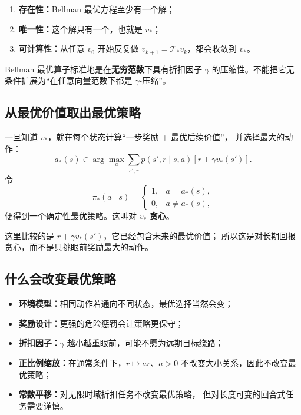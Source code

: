 \documentclass[11pt,a4paper,fontset=fandol]{ctexart}
\newcommand{\vstar}{v_*}
\newcommand{\Tstar}{\mathcal{T}_*}
\begin{document}
\begin{enumerate}
  \item \textbf{存在性：}Bellman 最优方程至少有一个解；
  \item \textbf{唯一性：}这个解只有一个，也就是 \(\vstar\)；
  \item \textbf{可计算性：}从任意 \(v_0\) 开始反复做
  \(v_{k+1}=\Tstar v_k\)，都会收敛到 \(\vstar\)。
\end{enumerate}

\begin{warningbox}[范数条件]
Bellman 最优算子标准地是在\textbf{无穷范数}下具有折扣因子
\(\gamma\) 的压缩性。不能把它无条件扩展为“在任意向量范数下都是
\(\gamma\)-压缩”。
\end{warningbox}

\subsection{从最优价值取出最优策略}

一旦知道 \(\vstar\)，就在每个状态计算“一步奖励 + 最优后续价值”，
并选择最大的动作：
\[
a_*(s)\in\arg\max_a
\sum_{s',r}p(s',r\mid s,a)
\left[r+\gamma\vstar(s')\right].
\]
令
\[
\pi_*(a\mid s)=
\begin{cases}
1,&a=a_*(s),\\
0,&a\neq a_*(s),
\end{cases}
\]
便得到一个确定性最优策略。这叫对 \(\vstar\) \textbf{贪心}。

\begin{warningbox}[“贪心”并不等于只看即时奖励]
这里比较的是 \(r+\gamma\vstar(s')\)，它已经包含未来的最优价值；
所以这是对长期回报贪心，而不是只挑眼前奖励最大的动作。
\end{warningbox}

\subsection{什么会改变最优策略}

\begin{itemize}
  \item \textbf{环境模型：}相同动作若通向不同状态，最优选择当然会变；
  \item \textbf{奖励设计：}更强的危险惩罚会让策略更保守；
  \item \textbf{折扣因子：}\(\gamma\) 越小越重眼前，可能不愿为远期目标绕路；
  \item \textbf{正比例缩放：}在通常条件下，\(r\mapsto ar\)、\(a>0\)
  不改变大小关系，因此不改变最优策略；
  \item \textbf{常数平移：}对无限时域折扣任务不改变最优策略，
  但对长度可变的回合式任务需要谨慎。
\end{itemize}
\end{document}
